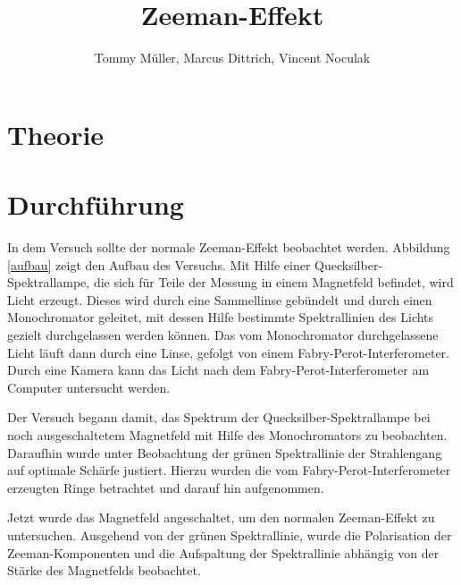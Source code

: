 \documentclass[10pt,a4paper]{article}
\author{Tommy Müller, Marcus Dittrich, Vincent Noculak}
\title{Zeeman-Effekt}
\begin{document}
\maketitle
\newpage
\tableofcontents
\newpage

\section{Theorie}

\section{Durchführung}

In dem Versuch sollte der normale Zeeman-Effekt beobachtet werden. Abbildung \ref{aufbau} zeigt den Aufbau des Versuchs. Mit Hilfe einer Quecksilber-Spektrallampe, die sich für Teile der Messung in einem Magnetfeld befindet, wird Licht erzeugt. Dieses wird durch eine Sammellinse gebündelt und durch einen Monochromator geleitet, mit dessen Hilfe bestimmte Spektrallinien des Lichts gezielt durchgelassen werden können. Das vom Monochromator durchgelassene Licht läuft dann durch eine Linse, gefolgt von einem Fabry-Perot-Interferometer. Durch eine Kamera kann das Licht nach dem Fabry-Perot-Interferometer am Computer untersucht werden. 

Der Versuch begann damit, das Spektrum der Quecksilber-Spektrallampe bei noch ausgeschaltetem Magnetfeld mit Hilfe des Monochromators zu beobachten. Daraufhin wurde unter Beobachtung der grünen Spektrallinie der Strahlengang auf optimale Schärfe justiert. Hierzu wurden die vom Fabry-Perot-Interferometer erzeugten Ringe betrachtet und darauf hin aufgenommen.

Jetzt wurde das Magnetfeld angeschaltet, um den normalen Zeeman-Effekt zu untersuchen. Ausgehend von der grünen Spektrallinie, wurde die Polarisation der Zeeman-Komponenten und die Aufspaltung der Spektrallinie abhängig von der Stärke des Magnetfelds beobachtet.
\end{document}
